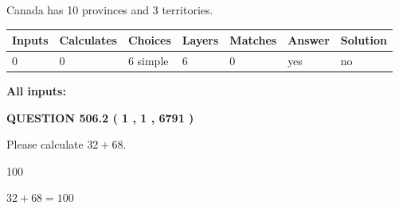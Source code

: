 \documentclass[12pt]{article}
\begin{document}
 
Canada has 10  provinces and 3 territories.
 
 
\noindent{}
 
 
   
   
   
   
\noindent\begin{tabular}{|l|l|l|l|l|l|l|}
 \hline
Inputs & Calculates & Choices & Layers & Matches & Answer & Solution \\ \hline
 0  & 
 0  & 
 6
  simple  
  & 
 6  & 
 0  & 
  yes & 
  no 
  \\ \hline
 \end{tabular}
   
   
   
   
\noindent{}
   
   
   
   
\noindent\vspace{0.1in}\hspace{-0.08in} {\textbf{\Large{All inputs: }}}
   
   
  
\vspace{0.2in}
  
{\textbf{\Large{QUESTION
506.2 
 ( 1 , 1 , 6791 )
}}}
  
  
 
Please calculate $ %
32 +  %
68 $.
 
 
 
\noindent{}
 
 

100
 
 
\noindent{}
 
 

 
 
 
\noindent{}
 
 

$ %
32 +  %
68=   %
100$
 
 
\noindent{}
 
 

 
   
\end{document}
